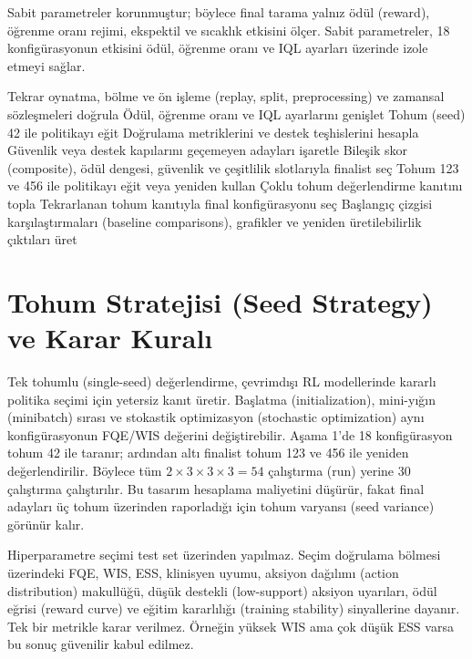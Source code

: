 \documentclass[conference]{IEEEtran}
\begin{document}
Sabit parametreler korunmuştur; böylece final tarama yalnız ödül (reward), öğrenme oranı rejimi, ekspektil ve sıcaklık etkisini ölçer. Sabit parametreler, 18 konfigürasyonun etkisini ödül, öğrenme oranı ve IQL ayarları üzerinde izole etmeyi sağlar.

\begin{algorithm}[t]
\caption{Final IQL Tarama ve Raporlama İş Akışı}
\label{alg:workflow}
\begin{algorithmic}[1]
\STATE Tekrar oynatma, bölme ve ön işleme (replay, split, preprocessing) ve zamansal sözleşmeleri doğrula
\STATE Ödül, öğrenme oranı ve IQL ayarlarını genişlet
 \STATE Tohum (seed) 42 ile politikayı eğit
 \STATE Doğrulama metriklerini ve destek teşhislerini hesapla
\ENDFOR
\STATE Güvenlik veya destek kapılarını geçemeyen adayları işaretle
\STATE Bileşik skor (composite), ödül dengesi, güvenlik ve çeşitlilik slotlarıyla finalist seç
 \STATE Tohum 123 ve 456 ile politikayı eğit veya yeniden kullan
 \STATE Çoklu tohum değerlendirme kanıtını topla
\ENDFOR
\STATE Tekrarlanan tohum kanıtıyla final konfigürasyonu seç
\STATE Başlangıç çizgisi karşılaştırmaları (baseline comparisons), grafikler ve yeniden üretilebilirlik çıktıları üret
\end{algorithmic}
\end{algorithm}

\section{Tohum Stratejisi (Seed Strategy) ve Karar Kuralı}
Tek tohumlu (single-seed) değerlendirme, çevrimdışı RL modellerinde kararlı politika seçimi için yetersiz kanıt üretir. Başlatma (initialization), mini-yığın (minibatch) sırası ve stokastik optimizasyon (stochastic optimization) aynı konfigürasyonun FQE/WIS değerini değiştirebilir. Aşama 1'de 18 konfigürasyon tohum 42 ile taranır; ardından altı finalist tohum 123 ve 456 ile yeniden değerlendirilir. Böylece tüm $2\times3\times3\times3=54$ çalıştırma (run) yerine 30 çalıştırma çalıştırılır. Bu tasarım hesaplama maliyetini düşürür, fakat final adayları üç tohum üzerinden raporladığı için tohum varyansı (seed variance) görünür kalır.

Hiperparametre seçimi test set üzerinden yapılmaz. Seçim doğrulama bölmesi üzerindeki FQE, WIS, ESS, klinisyen uyumu, aksiyon dağılımı (action distribution) makullüğü, düşük destekli (low-support) aksiyon uyarıları, ödül eğrisi (reward curve) ve eğitim kararlılığı (training stability) sinyallerine dayanır. Tek bir metrikle karar verilmez. Örneğin yüksek WIS ama çok düşük ESS varsa bu sonuç güvenilir kabul edilmez.
\end{document}
